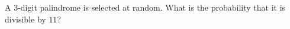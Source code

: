 A $3$-digit palindrome is selected at random. What is the probability that it is divisible by $11$?
